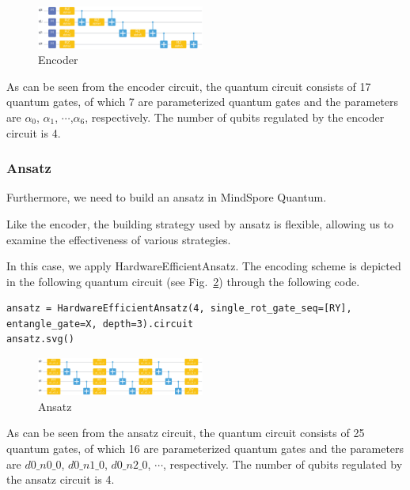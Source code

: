 \begin{figure}[H]
    \centering
    \includegraphics[width=0.49\textwidth]{5.1_figures/encoder-circuit.eps}
    \caption{Encoder}
    \label{5.1encoder-circuit}
\end{figure}

As can be seen from the encoder circuit, the quantum circuit consists of 17 quantum gates, of which 7 are
parameterized quantum gates and the parameters are $\alpha_0$, $\alpha_1$, $\cdots$,$\alpha_6$, respectively. The number of qubits regulated by the encoder circuit is 4.

\subsubsection{Ansatz}
Furthermore, we need to build an ansatz in MindSpore Quantum.

Like the encoder, the building strategy used by ansatz is flexible, allowing us to examine the effectiveness of various strategies.

In this case, we apply HardwareEfficientAnsatz. The encoding scheme is depicted in the following quantum circuit (see Fig.~\ref{5.1ansatz-circuit}) through the following code.

\begin{lstlisting}
ansatz = HardwareEfficientAnsatz(4, single_rot_gate_seq=[RY], entangle_gate=X, depth=3).circuit     
ansatz.svg()
\end{lstlisting}

\begin{figure}[H]
    \centering
    \includegraphics[width=0.49\textwidth]{5.1_figures/ansatz-circuit.eps}
    \caption{Ansatz}
    \label{5.1ansatz-circuit}
\end{figure}

As can be seen from the ansatz circuit, the quantum circuit consists of 25 quantum gates, of which 16 are parameterized quantum gates and the parameters are $d0\_n0\_0$, $d0\_n1\_0$, $d0\_n2\_0$, $\cdots$,  respectively. The number of qubits regulated by the ansatz circuit is 4.

